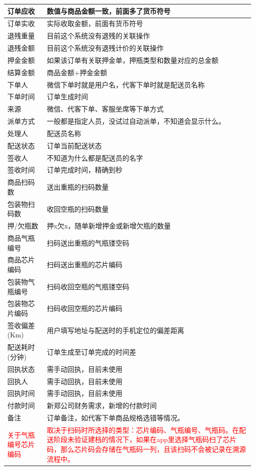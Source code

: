 \documentclass[UTF8]{ctexart}
\begin{document}
\begin{longtable}[h!]{ | m{3cm} | m{12cm} | }
		\hline
		订单应收& 数值与商品金额一致，前面多了货币符号\\
		\hline
		订单实收& 实际收取金额，前面有货币符号\\
		\hline
		退残重量& 目前这个系统没有退残的关联操作\\
		\hline
		退残金额& 目前这个系统没有退残计价的关联操作\\
		\hline
		押金金额& 如果该订单有关联押金单，押瓶类型和数量对应的总金额\\
		\hline
		结算金额& 商品金额+押金金额\\
		\hline
		下单人& 微信下单时就是用户名，代客下单时就是配送员名称\\
		\hline
		下单时间& 订单生成时间\\
		\hline
		来源& 微信、代客下单、客服坐席等下单方式\\
		\hline
		派单方式& 一般都是指定人员，没试过自动派单，不知道会显示什么。\\
		\hline
		处理人& 配送员名称\\
		\hline
		配送状态& 订单当前配送状态\\
		\hline
		签收人& 不知道为什么都是配送员的名字\\
		\hline
		签收时间& 订单完成时间，精确到秒\\
		\hline
		商品扫码数& 送出重瓶的扫码数量\\
		\hline
		包装物扫码数& 收回空瓶的扫码数量\\
		\hline
		押/欠瓶数& 押x欠x，随单新增押金或新增欠瓶的数量\\
		\hline
		商品气瓶编号& 扫码送出重瓶的气瓶镂空码\\
		\hline
		商品芯片编码& 扫码送出重瓶的芯片编码\\
		\hline
		包装物气瓶编号& 扫码收回空瓶的气瓶镂空码\\
		\hline
		包装物芯片编码& 扫码收回空瓶的芯片编码\\
		\hline
		签收偏差(Km)& 用户填写地址与配送时的手机定位的偏差距离\\
		\hline
		配送耗时(分钟)& 订单生成至订单完成的时间差\\
		\hline
		回执状态& 需手动回执，目前未使用\\
		\hline
		回执人	& 需手动回执，目前未使用 \\
		\hline
		回执时间& 需手动回执，目前未使用\\
		\hline
		付款时间& 新郑公司财务需求，新增的付款时间\\
		\hline
		备注& 订单备注，如代客下单商品规格选错等情况。\\
		\hline
		\textcolor{red}{关于气瓶编号芯片编码}& \textcolor{red}{取决于扫码时所选择的类型：芯片编码、气瓶编号、气瓶码。在配送阶段未验证建档的情况下，如果在app里选择气瓶码扫了芯片码，那么芯片码会存储在气瓶码一列，且该扫码不会被记录在溯源流程中。}\\
		\hline

\end{longtable}
\end{document}
